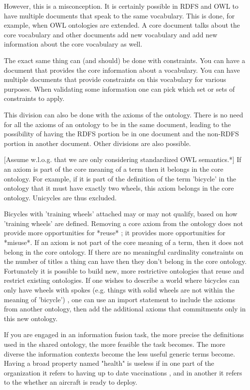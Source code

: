 \documentclass{llncs}
\begin{document}
However, this is a misconception.  It is certainly possible in RDFS and OWL to 
have multiple documents that speak to the same vocabulary.  This is done, for 
example, when OWL ontologies are extended.  A core document talks about the 
core vocabulary and other documents add new vocabulary and add new information 
about the core vocabulary as well.

The exact same thing can (and should) be done with constraints.  You can have 
a document that provides the core information about a vocabulary.  You can 
have multiple documents that provide constraints on this vocabulary for 
various purposes.  When validating some information one can pick which set or 
sets of constraints to apply.

This division can also be done with the axioms of the ontology.  There is no 
need for all the axioms of an ontology to be in the same document, leading to 
the possibility of having the RDFS portion be in one document and the non-RDFS 
portion in another document.  Other divisions are also possible.

[Assume w.l.o.g. that we are only considering standardized OWL semantics.*]
If an axiom is part of the core meaning of a term then it belongs in the core  ontology.  For example, if it is part of the definition of the term  'bicycle' in the ontology that it must have exactly two wheels, this axiom belongs in the core ontology. Unicycles are thus excluded.  

Bicycles with 'training wheels' attached may or may not qualify, based on how 'training wheels' are defined.  
Removing a core axiom from the ontology does not provide more opportunities for *reuse* ; it provides more opportunities for *misuse*.
If an axiom is not part of the core meaning of a term, then it does not belong in the core ontology.  If there are no meaningful cardinality constraints on the number of titles a thing can have then they don't belong in the core ontology.
Fortunately it is possible to build new, more restrictive ontologies that reuse and restrict existing ontologies. If one wishes to describe a world where bicycles can only have wheels with spokes (e.g.  things with solid wheels are not within the meaning of 'bicycle') , one can use an import statement to include the axioms from another ontology, then add the additional axioms that commitments only in this new ontology.

If you are engaged in an information fusion task, the more precise the definitions used in the shared ontology, the more feasible the task becomes.  The more diverse the information contexts become the less useful generic terms become.
Having a broad  property named "health" is useless if in one part of the organization it refers to having up to date vaccinations , and in another it refers to the whether an aircraft is ready to deploy.
\end{document}
